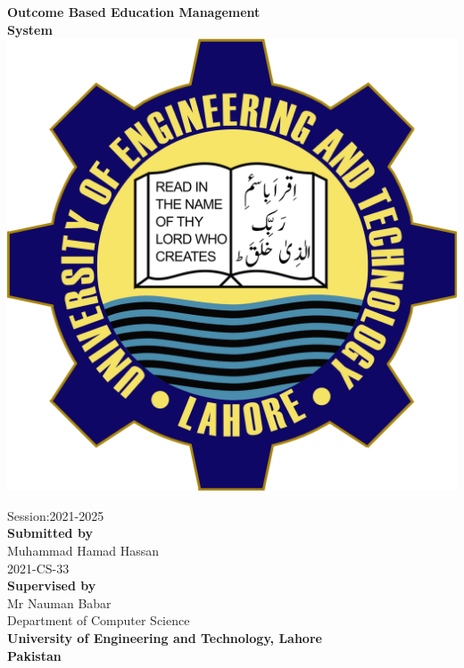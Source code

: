 \documentclass[12pt,a4paper]{article}
\begin{document}
\thispagestyle{empty}
\begin{center}
\vspace{3cm}
\textbf{\LARGE {Outcome Based Education Management }}\\
\textbf{\LARGE {System }}\\


\vspace{3cm}
\includegraphics[scale=.15]{UETLogo}\\
\vspace{1cm}

Session:2021-2025\\
\vspace{2cm}
\textbf{\large {Submitted by}}\\
\vspace{0.5cm}
\large {Muhammad Hamad Hassan}
\\
\large {2021-CS-33}
\\
\vspace{2cm}
\textbf{\large {Supervised by}}\\
\vspace{0.5cm}
\large {Mr Nauman Babar }
\\

\vspace{3cm}
Department of Computer Science\\
\textbf{\large {University of Engineering and Technology, Lahore}}\\
\textbf{\large {Pakistan}}\\
\end{center}
\end{document}
